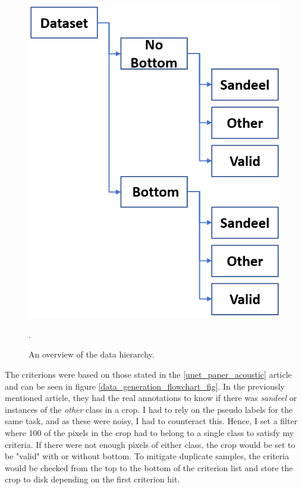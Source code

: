         
        \clearpage
        \begin{figure}[H]
            \centering
            \includegraphics[scale=0.5]{figures/data_hierarki.png}
            \caption{An overview of the data hierarchy.}.
          	\medskip 
            \label{data_hierarchy_fig}
        \end{figure}
        
        The criterions were based on those stated in the \ref{unet_paper_acoustic} article and can be seen in figure \ref{data_generation_flowchart_fig}. In the previously mentioned article, they had the real annotations to know if there was \textit{sandeel} or instances of the \textit{other} class in a crop. I had to rely on the pseudo labels for the same task, and as these were noisy, I had to counteract this. Hence, I set a filter where 100 of the pixels in the crop had to belong to a single class to satisfy my criteria. If there were not enough pixels of either class, the crop would be set to be "valid" with or without bottom. To mitigate duplicate samples, the criteria would be checked from the top to the bottom of the criterion list and store the crop to disk depending on the first criterion hit.
        
